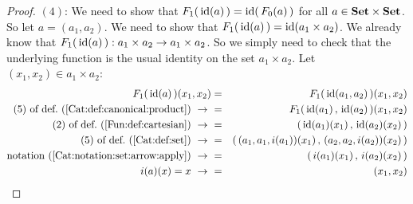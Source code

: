 \begin{proof}
    $(4)$: We need to show that $F_{1}(\,\mbox{\rm id}(a)\,)=\mbox{\rm id}(\,F_{0}(a)\,)$ for all 
    $a\in\mbox{\bf Set}\times\mbox{\bf Set}$. So let $a=(a_{1},a_{2})$. We need to show that
    $F_{1}(\,\mbox{\rm id}(a)\,)=\mbox{\rm id}(a_{1}\times a_{2})$. We already know that
    $F_{1}(\,\mbox{\rm id}(a)\,):a_{1}\times a_{2}\to a_{1}\times a_{2}$. So we simply
    need to check that the underlying function is the usual identity on the
    set $a_{1}\times a_{2}$. Let $(x_{1},x_{2})\in a_{1}\times a_{2}$:
        \begin{eqnarray*}F_{1}(\,\id(a)\,)(x_{1},x_{2})
            &=&F_{1}(\,\id(a_{1},a_{2})\,)(x_{1},x_{2})\\
            \mbox{$(5)$ of def.~(\ref{Cat:def:canonical:product})}\ \to\ 
            &=&F_{1}(\,\id(a_{1})\,,\,\id(a_{2})\,)(x_{1},x_{2})\\
            \mbox{$(2)$ of def.~(\ref{Fun:def:cartesian})}\ \to\ 
            &=&(\,\id(a_{1})(x_{1})\,,\,\id(a_{2})(x_{2})\,)\\
            \mbox{$(5)$ of def.~(\ref{Cat:def:set})}\ \to\ 
            &=&(\,(a_{1},a_{1},i(a_{1}))(x_{1})\,
               ,\,(a_{2},a_{2},i(a_{2}))(x_{2})\,)\\
            \mbox{notation~(\ref{Cat:notation:set:arrow:apply})}\ \to\ 
            &=&(\,i(a_{1})(x_{1})\,,\,i(a_{2})(x_{2})\,)\\
            i(a)(x)=x\ \to\ 
            &=&(x_{1},x_{2})
        \end{eqnarray*}


\end{proof}
